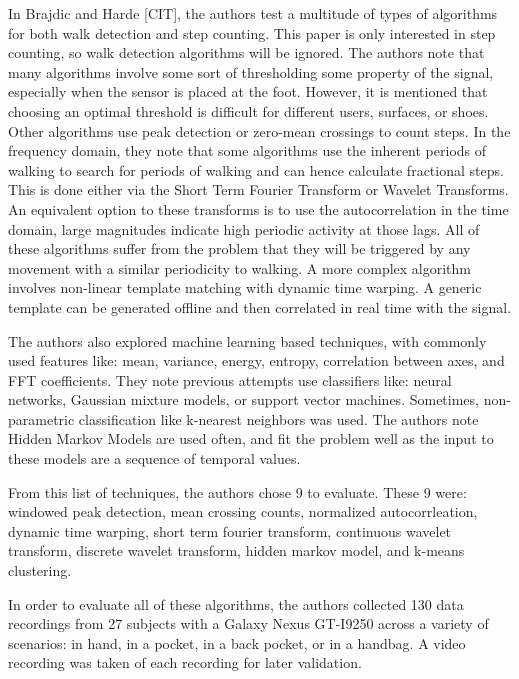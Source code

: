                 In Brajdic and Harde [CIT], the authors test a multitude of types of algorithms for both walk detection and step counting. This paper is only interested in step counting, so walk detection algorithms will be ignored. The authors note that many algorithms involve some sort of thresholding some property of the signal, especially when the sensor is placed at the foot. However, it is mentioned that choosing an optimal threshold is difficult for different users, surfaces, or shoes. Other algorithms use peak detection or zero-mean crossings to count steps. In the frequency domain, they note that some algorithms use the inherent periods of walking to search for periods of walking and can hence calculate fractional steps. This is done either via the Short Term Fourier Transform or Wavelet Transforms. An equivalent option to these transforms is to use the autocorrelation in the time domain, large magnitudes indicate high periodic activity at those lags. All of these algorithms suffer from the problem that they will be triggered by any movement with a similar periodicity to walking. A more complex algorithm involves non-linear template matching with dynamic time warping. A generic template can be generated offline and then correlated in real time with the signal. 

                The authors also explored machine learning based techniques, with commonly used features like: mean, variance, energy, entropy, correlation between axes, and FFT coefficients. They note previous attempts use classifiers like: neural networks, Gaussian mixture models, or support vector machines. Sometimes, non-parametric classification like k-nearest neighbors was used. The authors note Hidden Markov Models are used often, and fit the problem well as the input to these models are a sequence of temporal values.

                From this list of techniques, the authors chose 9 to evaluate. These 9 were: windowed peak detection, mean crossing counts, normalized autocorrleation, dynamic time warping, short term fourier transform, continuous wavelet transform, discrete wavelet transform, hidden markov model, and k-means clustering. 

                In order to evaluate all of these algorithms, the authors collected 130 data recordings from 27 subjects with a Galaxy Nexus GT-I9250 across a variety of scenarios: in hand, in a pocket, in a back pocket, or in a handbag. A video recording was taken of each recording for later validation.

